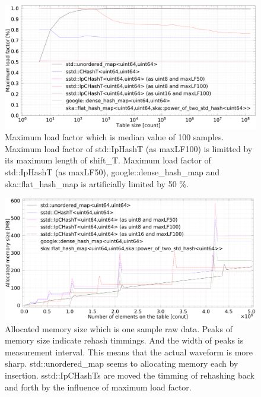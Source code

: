 
\begin{figure}[h]
  \includegraphics[scale=0.24]{./fig_bench_usm/maxLoadFactor_med.pdf}
  \caption{
    Maximum load factor which is median value of 100 samples.
    Maximum load factor of std::IpHashT (as maxLF100) is limitted by its maximum length of shift\_T.
    Maximum load factor of std::IpHashT (as maxLF50), google::dense\_hash\_map and ska::flat\_hash\_map is artificially limited by 50 \%.
  }
  \label{fig_bench_LF}
\end{figure}

\begin{figure}[h]
  \hspace{-1mm}
  \includegraphics[scale=0.24]{./fig_bench_usm/usedMemory.pdf}
  \caption{
    Allocated memory size which is one sample raw data.
    Peaks of memory size indicate rehash timmings.
    And the width of peaks is measurement interval.
    This means that the actual waveform is more sharp.
    std::unordered\_map seems to allocating memory each by insertion.
    sstd::IpCHashTs are moved the timming of rehashing back and forth by the influence of maximum load factor.
  }
  \label{fig_bench_memory}
\end{figure}

